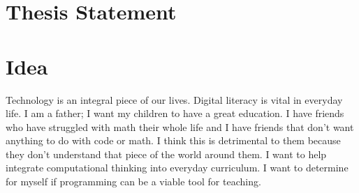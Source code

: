 \section{Thesis Statement}

\section*{Idea}
Technology is an integral piece of our lives. Digital literacy is vital in everyday life.
I am a father; I want my children to have a great education.
I have friends who have struggled with math their whole life and I have friends that don't want anything to do with code or math. I think this is detrimental to them because they don't understand that piece of the world around them. 
I want to help integrate computational thinking into everyday curriculum.
I want to determine for myself if programming can be a viable tool for teaching.


